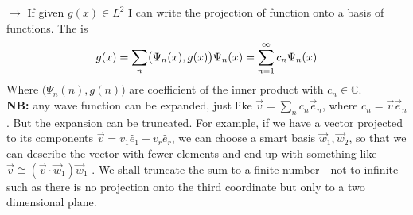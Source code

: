 $\rightarrow$ If given $g(x)\in L^2$ I can write the projection of function onto a basis of functions. The  is\\
\[
g(x)=\sum_{n}\bigl(\Psi_n(x),g(x)\bigr)\Psi_n(x) =\sum_{n=1}^{\infty}c_n\Psi_n(x)\\
\]
Where $\bigl(\Psi_n(n),g(n)\bigr)$ are coefficient of the inner product with $c_n\in \mathbb{C}$. \\

\textbf{NB:} any wave function can be expanded, just like $\vec{v} = \sum_n c_n \vec{e}_n$, where $c_n = \vec{v} \vec{e}_n$. But the expansion can be truncated. For example, if we have a vector projected to its components $\vec v = v_1\hat{e}_1+v_r\hat{e}_r$, we can choose a smart basis ${\vec{w}_1, \vec{w}_2}$, so that we can describe the vector with fewer elements and end up with something like $ \vec{v} \cong (\vec{v} \cdot \vec{w}_1) \vec{w}_1 $ .
We shall truncate the sum to a finite number - not to infinite - such as there is no projection onto the third coordinate but only to a two dimensional plane.\\


